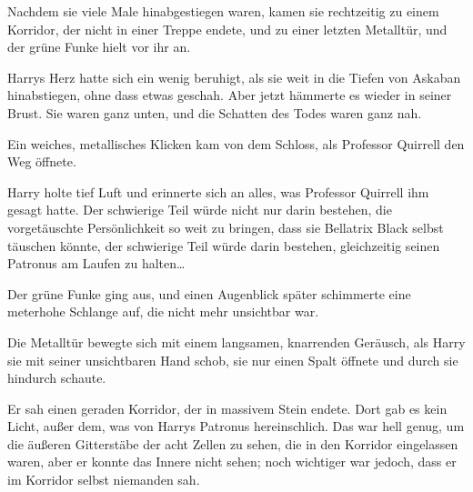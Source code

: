 \later

Nachdem sie viele Male hinabgestiegen waren, kamen sie rechtzeitig zu einem Korridor, der nicht in einer Treppe endete, und zu einer letzten Metalltür, und der grüne Funke hielt vor ihr an.

Harrys Herz hatte sich ein wenig beruhigt, als sie weit in die Tiefen von Askaban hinabstiegen, ohne dass etwas geschah. Aber jetzt hämmerte es wieder in seiner Brust. Sie waren ganz unten, und die Schatten des Todes waren ganz nah.

Ein weiches, metallisches Klicken kam von dem Schloss, als Professor Quirrell den Weg öffnete.

Harry holte tief Luft und erinnerte sich an alles, was Professor Quirrell ihm gesagt hatte. Der schwierige Teil würde nicht nur darin bestehen, die vorgetäuschte Persönlichkeit so weit zu bringen, dass sie Bellatrix Black selbst täuschen könnte, der schwierige Teil würde darin bestehen, gleichzeitig seinen Patronus am Laufen zu halten…

Der grüne Funke ging aus, und einen Augenblick später schimmerte eine meterhohe Schlange auf, die nicht mehr unsichtbar war.

Die Metalltür bewegte sich mit einem langsamen, knarrenden Geräusch, als Harry sie mit seiner unsichtbaren Hand schob, sie nur einen Spalt öffnete und durch sie hindurch schaute.

Er sah einen geraden Korridor, der in massivem Stein endete. Dort gab es kein Licht, außer dem, was von Harrys Patronus hereinschlich. Das war hell genug, um die äußeren Gitterstäbe der acht Zellen zu sehen, die in den Korridor eingelassen waren, aber er konnte das Innere nicht sehen; noch wichtiger war jedoch, dass er im Korridor selbst niemanden sah.

